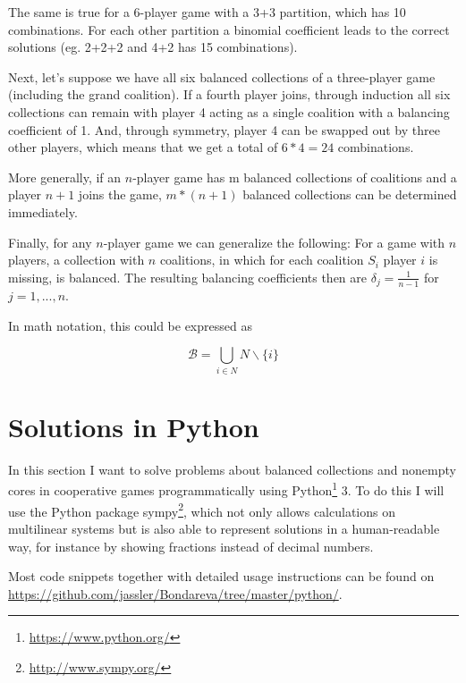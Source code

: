 \documentclass[10pt,a4paper,titlepage]{article}
\theoremstyle{plain}
\theoremstyle{definition}
\begin{document}
The same is true for a 6-player game with a 3+3 partition, which has 10 combinations. For each other partition a binomial coefficient leads to the correct solutions (eg. 2+2+2 and 4+2 has 15 combinations).\vspace{8pt}

Next, let's suppose we have all six balanced collections of a three-player game (including the grand coalition). If a fourth player joins, through induction all six collections can remain with player 4 acting as a single coalition with a balancing coefficient of 1. And, through symmetry, player 4 can be swapped out by three other players, which means that we get a total of $6*4 = 24$ combinations.

More generally, if an $n$-player game has m balanced collections of coalitions and a player $n+1$ joins the game, $m*(n+1)$ balanced collections can be determined immediately.\vspace{8pt}

Finally, for any $n$-player game we can generalize the following: For a game with $n$ players, a collection with $n$ coalitions, in which for each coalition $S_i$ player $i$ is missing, is balanced. The resulting balancing coefficients then are $\delta_j = \frac{1}{n-1}$ for $j = 1, ..., n$.

In math notation, this could be expressed as 

\begin{equation*}
    \mathcal{B} = \bigcup_{i \in N} N \backslash \{i\}
\end{equation*}\vspace{30pt}


\section{Solutions in Python}

In this section I want to solve problems about balanced collections and nonempty cores in cooperative games programmatically using Python\footnote{\url{https://www.python.org/}} 3. To do this I will use the Python package sympy\footnote{\url{http://www.sympy.org/}}, which not only allows calculations on multilinear systems but is also able to represent solutions in a human-readable way, for instance by showing fractions instead of decimal numbers.

Most code snippets together with detailed usage instructions can be found on \url{https://github.com/jassler/Bondareva/tree/master/python/}.
\end{document}
